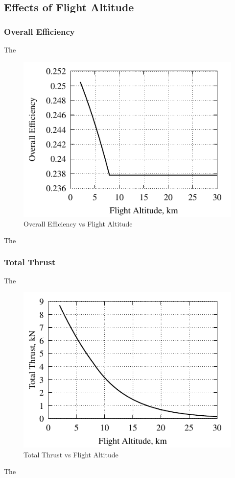 \documentclass[conf]{new-aiaa} %
\begin{document}
\subsection{Effects of Flight Altitude} %
\subsubsection{Overall Efficiency}
The

\begin{figure}[H] %
    \centering
    \includegraphics[]{media/performance_parameter_files/part_d_eta_o.pdf}
    \caption{\label{fig:partdetao}Overall Efficiency vs Flight Altitude}
\end{figure}
The

\subsubsection{Total Thrust}
The

\begin{figure}[H] %
    \centering
    \includegraphics[]{media/performance_parameter_files/part_d_T.pdf}
    \caption{\label{fig:partdt}Total Thrust vs Flight Altitude}
\end{figure}
The
\end{document}
